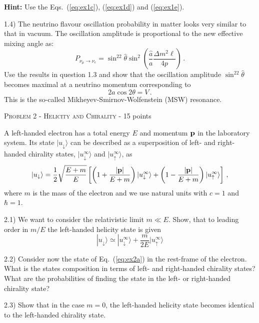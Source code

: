 \documentclass[a4paper,11pt]{report}
\begin{document}
{\bf Hint:} Use the Eqs.~(\ref{eq:ex1c}), (\ref{eq:ex1d}) and (\ref{eq:ex1e}).

1.4) The neutrino flavour oscillation probability in matter looks very similar to that in vacuum. The oscillation amplitude is proportional to the new effective mixing angle as:
\begin{equation}
P_{\nu_\mu\to\nu_e} = \sin^22\hat{\theta}\sin^2\left(\frac{\hat{a}}{a}\frac{\Delta m^2\ell}{4p}\right)\,.
\end{equation}
Use the results in question 1.3 and show that the oscillation amplitude $\sin^22\hat{\theta}$ becomes maximal at a neutrino momentum corresponding to 
\begin{equation}
2a\cos2\theta = V\,.
\end{equation} 
This is the so-called Mikheyev-Smirnov-Wolfenstein (MSW) resonance.
\vspace{1cm}

{\large \textsc{Problem 2 - Helicity and Chirality} - 15 points}

A left-handed electron has a total energy $E$ and momentum ${\bf p}$ in the laboratory system. Its state $|u_\downarrow\rangle$ can be described as a superposition of left- and right-handed chirality states, $|u_\downarrow^\infty\rangle$ and $|u_\uparrow^\infty\rangle$, as 
\begin{equation}\label{eq:ex2a}
|u_\downarrow\rangle =\frac{1}{2}\sqrt{\frac{E+m}{E}}\left[ \left(1+\frac{|{\bf p}|}{E+m}\right)|u_\downarrow^\infty\rangle+\left(1-\frac{|{\bf p}|}{E+m}\right)|u_\uparrow^\infty\rangle\right]\,,
\end{equation}
where $m$ is the mass of the electron and we use natural units with $c=1$ and $\hbar=1$.

2.1) We want to consider the relativistic limit $m\ll E$. Show, that to leading order in $m/E$ the left-handed helicity state is given
\[
|u_\downarrow\rangle \simeq |u_\downarrow^\infty\rangle +\frac{m}{2E}|u_\uparrow^\infty\rangle
\]

2.2) Consider now the state of Eq.~(\ref{eq:ex2a}) in the rest-frame of the electron. What is the states composition in terms of left- and right-handed chirality states? What are the probabilities of finding the state in the left- or right-handed chirality state?

2.3) Show that in the case $m=0$, the left-handed helicity state becomes identical to the left-handed chirality state.
\end{document}
